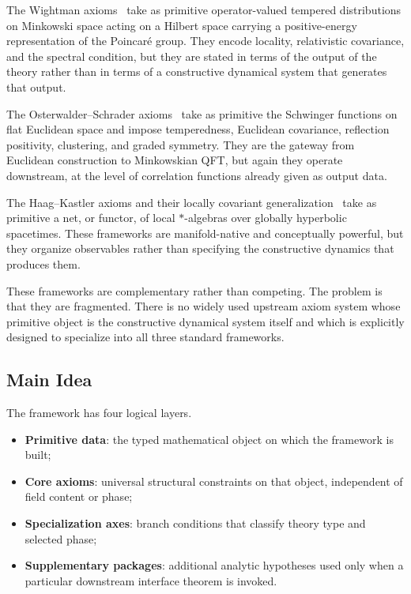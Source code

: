 \documentclass[12pt,a4paper]{article}
\theoremstyle{plain}
\theoremstyle{definition}
\theoremstyle{remark}
\begin{document}
The Wightman axioms~\cite{Wightman1956, StreaterWightman} take as
primitive operator-valued tempered distributions on Minkowski space
acting on a Hilbert space carrying a positive-energy representation of
the Poincar\'e group. They encode locality, relativistic covariance,
and the spectral condition, but they are stated in terms of the output
of the theory rather than in terms of a constructive dynamical system
that generates that output.

The Osterwalder--Schrader axioms~\cite{OS1, OS2} take as primitive
the Schwinger functions on flat Euclidean space and impose
temperedness, Euclidean covariance, reflection positivity, clustering,
and graded symmetry. They are the gateway from Euclidean construction
to Minkowskian QFT, but again they operate downstream, at the level
of correlation functions already given as output data.

The Haag--Kastler axioms and their locally covariant
generalization~\cite{Haag, BFV} take as primitive a net, or functor,
of local $*$-algebras over globally hyperbolic spacetimes. These
frameworks are manifold-native and conceptually powerful, but they
organize observables rather than specifying the constructive dynamics
that produces them.

These frameworks are complementary rather than competing. The problem
is that they are fragmented. There is no widely used upstream axiom
system whose primitive object is the constructive dynamical system
itself and which is explicitly designed to specialize into all three
standard frameworks.

\subsection{Main Idea}

The framework has four logical layers.

\begin{itemize}[nosep]
\item \textbf{Primitive data}: the typed mathematical object on which
  the framework is built;
\item \textbf{Core axioms}: universal structural constraints on that
  object, independent of field content or phase;
\item \textbf{Specialization axes}: branch conditions that classify
  theory type and selected phase;
\item \textbf{Supplementary packages}: additional analytic hypotheses
  used only when a particular downstream interface theorem is invoked.
\end{itemize}
\end{document}
